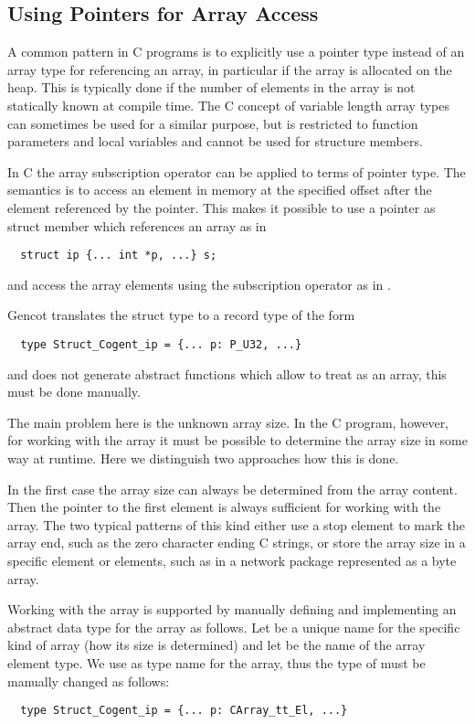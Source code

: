 \subsection{Using Pointers for Array Access}
\label{app-trans-arrpoint}

A common pattern in C programs is to explicitly use a pointer type instead of an array type for referencing an array,
in particular if the array is allocated on the heap. This is typically done if the number of elements in the
array is not statically known at compile time. The C concept of variable length array types can sometimes be
used for a similar purpose, but is restricted to function parameters and local variables and cannot be used for
structure members.

In C the array subscription operator can be applied to terms of pointer type. The semantics is to access an element 
in memory at the specified offset after the element referenced by the pointer. This makes it possible to use 
a pointer as struct member which references an array as in
\begin{verbatim}
  struct ip {... int *p, ...} s;
\end{verbatim}
and access the array elements using the subscription operator as in .

Gencot translates the struct type to a record type of the form
\begin{verbatim}
  type Struct_Cogent_ip = {... p: P_U32, ...}
\end{verbatim}
and does not generate abstract functions which allow to treat  as an array, this must be done manually.

The main problem here is the unknown array size. In the C program, however, for working with the array it must be
possible to determine the array size in some way at runtime. Here we distinguish two approaches how this is done.

In the first case the array size can always be determined from the array content. Then the pointer to the first 
element is always sufficient for working with the array. The two typical patterns of this kind either use a 
stop element to mark the array end, such as the zero character ending C strings, or store the array size in a
specific element or elements, such as in a network package represented as a byte array.

Working with the array is supported by manually defining and implementing an abstract data type for the array as follows.
Let  be a unique name for the specific kind of array (how its size is determined) and let  be the
name of the array element type. We use  as type name for the array, thus the 
type of  must be manually changed as follows:
\begin{verbatim}
  type Struct_Cogent_ip = {... p: CArray_tt_El, ...}
\end{verbatim}

